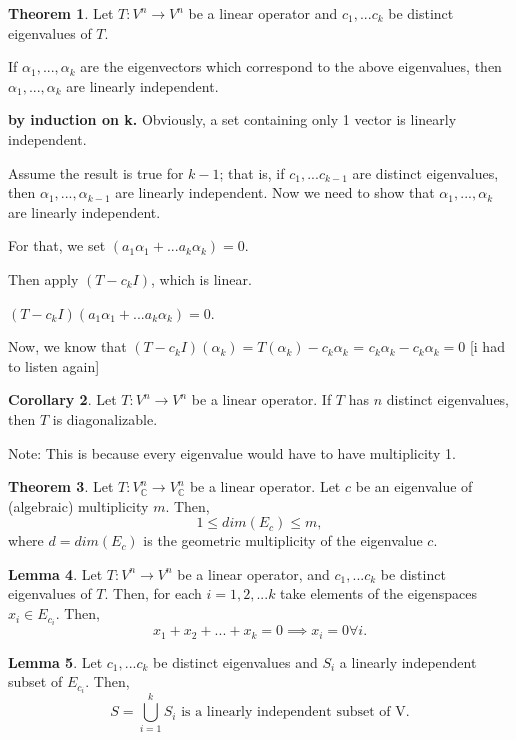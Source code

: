 \documentclass[a5paper]{article}
\makeatletter
\renewenvironment{proof}{{\bfseries Proof}}{\qed}
\renewenvironment{proof}[1][\bfseries \proofname]{\par
  \pushQED{\qed}%
  \normalfont \topsep6\p@\@plus6\p@\relax
  \trivlist
  \item[\hskip\labelsep
        \scshape
    #1\@addpunct{}]\ignorespaces
}{%
  \popQED\endtrivlist\@endpefalse
}
\theoremstyle{definition}%
\newtheorem{theorem}{Theorem}
\numberwithin{theorem}{section} %
\newtheorem{corollary}[theorem]{Corollary}
\newtheorem{lemma}[theorem]{Lemma}
\newcommand{\C}{\mathbb{C}}
\makeatother
\begin{document}
\begin{theorem}
Let $T:V^n \to V^n$ be a linear operator and $c_1, ... c_k$ be distinct eigenvalues of $T$. 

If $\alpha_1, ... , \alpha_k$ are the eigenvectors which correspond to the above eigenvalues, then $\alpha_1, ... , \alpha_k$ are linearly independent. 

\begin{proof}
\textbf{by induction on k.}
Obviously, a set containing only 1 vector is linearly independent. 

Assume the result is true for $k-1$; that is, if $c_1, ... c_{k-1}$ are distinct eigenvalues, then  $\alpha_1, ... , \alpha_{k-1}$ are linearly independent. Now we need to show that $\alpha_1, ... , \alpha_{k}$ are linearly independent. 

For that, we set $(a_1\alpha_1+...a_k\alpha_k) = 0$. 

Then apply $(T-c_kI)$, which is linear. 

$(T-c_kI)(a_1\alpha_1+...a_k\alpha_k) = 0$.

Now, we know that $(T-c_kI)(\alpha_k) = T(\alpha_k) - c_k\alpha_k$ = $c_k\alpha_k - c_k\alpha_k = 0$
[i had to listen again]
\end{proof}
\end{theorem}

\begin{corollary}
Let $T:V^n \to V^n$ be a linear operator.
If $T$ has $n$ distinct eigenvalues, then $T$ is diagonalizable. 

Note: This is because every eigenvalue would have to have multiplicity 1. 
\end{corollary}

\begin{theorem}
Let $T:V^n_\C \to V^n_\C$ be a linear operator. Let $c$ be an eigenvalue of (algebraic) multiplicity $m$. Then, 
$$1\leq dim(E_c) \leq m,$$ 
where $d = dim(E_c)$ is the geometric multiplicity of the eigenvalue $c$.   
\end{theorem}

\begin{lemma}
Let $T:V^n \to V^n$ be a linear operator, and  $c_1, ... c_{k}$ be distinct eigenvalues of $T$. Then, for each $i = 1,2,...k$ take elements of the eigenspaces $x_i \in E_{c_i}$. Then, $$x_1 + x_2 + ... + x_k = 0 \implies x_i = 0 \forall i.$$
\end{lemma}

\begin{lemma}
Let $c_1, ... c_{k}$ be distinct eigenvalues  and $S_i$ a linearly independent subset of $E_{c_i}$. Then, 
$$S = \bigcup_{i=1}^kS_i \text{ is a linearly independent subset of V.}$$
\end{lemma}
\end{document}
